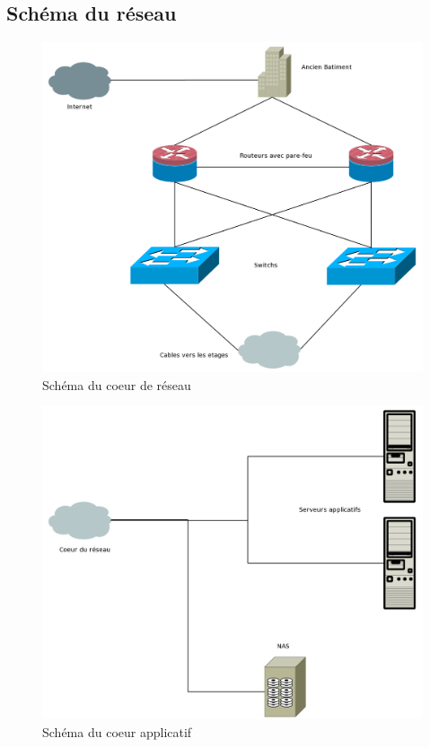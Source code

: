 %
    \cleardoublepage
%
%
\subsection{Schéma du réseau}

\begin{figure}[!ht]
    \center
    \includegraphics[width=1\textwidth]{./images/coeur-reseau.png}
    \caption{Schéma du coeur de réseau}
\end{figure}

\begin{figure}[!ht]
    \center
    \includegraphics[width=1\textwidth]{./images/coeur-applicatif.png}
    \caption{Schéma du coeur applicatif}
\end{figure}

